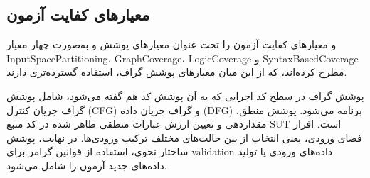 \documentclass[a4paper,12pt]{article}
\begin{document}
\subsection{معیارهای کفایت آزمون}
و 
 \cite{ammann2016introduction}
معیارهای کفایت آزمون را تحت عنوان معیارهای پوشش و به‌صورت چهار معیار 
\gls{InputSpacePartitioning}،  \gls{GraphCoverage}، \gls{LogicCoverage}
و
 \gls{SyntaxBasedCoverage}
  مطرح کرده‌اند، که از این میان معیارهای پوشش گراف، استفاده گسترده‌تری دارند.
\par
پوشش گراف در سطح کد اجرایی که به آن پوشش کد هم گفته می‌شود، شامل پوشش گراف جریان کنترل 
(\gls{CFG})
 و گراف جریان داده
 (\gls{DFG}) 
برنامه می‌شود. پوشش منطق، مقدار‌دهی و تعیین ارزش عبارات منطقی ظاهر شده در کد منبع 
\gls{SUT}
است. افراز فضای ورودی، یعنی انتخاب از بین حالت‌های مختلف ترکیب ورودی‌ها. در نهایت، پوشش ساختار نحوی، استفاده از قوانین گرامر برای 
\gls{validation}
 داده‌های ورودی یا تولید داده‌های جدید آزمون را شامل می‌شود.
\end{document}
